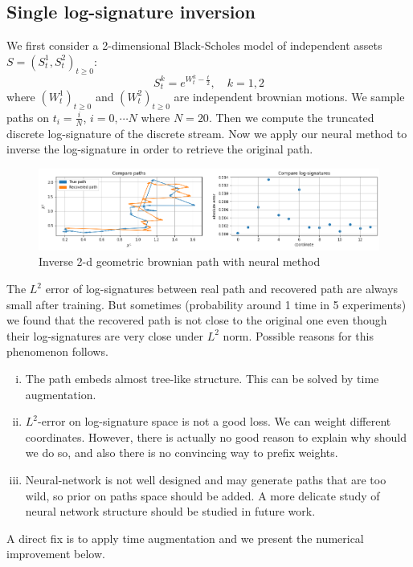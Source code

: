 \documentclass[12pt]{report}
\theoremstyle{definition}
\theoremstyle{remark}
\begin{document}
\subsection{Single log-signature inversion}
We first consider a 2-dimensional Black-Scholes model of independent assets $S = (S^{1}_{t}, S^{2}_{t})_{t\geq 0}$:
\begin{equation*}
  S^{k}_{t} = e^{W^{k}_{t} - \frac{t}{2}},\quad k = 1,2
\end{equation*}
where $(W^{1}_{t})_{t\geq 0}$ and $(W^{2}_{t})_{t\geq 0}$ are independent brownian motions. We sample paths on $t_{i} = \frac{i}{N}$, $i = 0,\cdots N$ where $N = 20$. Then we compute the truncated discrete log-signature of the discrete stream. Now we apply our neural method to inverse the log-signature in order to retrieve the original path.
 \begin{figure}[H]
    \centering
    \includegraphics[width=\textwidth]{figs/inverse2.png}
    \caption{Inverse 2-d geometric brownian path with neural method}
\end{figure}
The $L^{2}$ error of log-signatures between real path and recovered path are always small after training. But sometimes (probability around 1 time in 5 experiments) we found that the recovered path is not close to the original one even though their log-signatures are very close under $L^{2}$ norm. Possible reasons for this phenomenon follows.
\begin{enumerate}[(i)]
  \item The path embeds almost tree-like structure. This can be solved by time augmentation. 
  \item $L^{2}$-error on log-signature space is not a good loss. We can weight different coordinates. However, there is actually no good reason to explain why should we do so, and also there is no convincing way to prefix weights.
  \item Neural-network is not well designed and may generate paths that are too wild, so prior on paths space should be added. A more delicate study of neural network structure should be studied in future work.
\end{enumerate}
A direct fix is to apply time augmentation and we present the numerical improvement below. 
\end{document}
